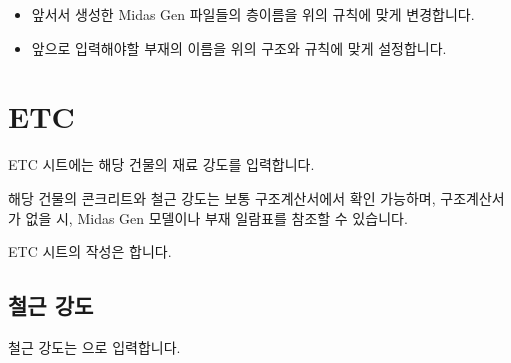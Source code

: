 \documentclass[a4paper,11pt,korean,openany,oneside]{sphinxmanual}
\begin{document}
\begin{figure}[htbp]
\centering
\capstart

\noindent{}
\caption{}\label{\detokenize{2_naming_rules:id5}}\end{figure}

\begin{sphinxShadowBox}
\begin{itemize}
\item {} 
\sphinxAtStartPar
앞서서 생성한 Midas Gen 파일들의 층이름을 위의 규칙에 맞게 변경합니다.

\item {} 
\sphinxAtStartPar
앞으로 입력해야할 부재의 이름을 위의 구조와 규칙에 맞게 설정합니다.

\end{itemize}
\end{sphinxShadowBox}

\sphinxstepscope


\section{ETC}
\label{\detokenize{2_etc:etc}}\label{\detokenize{2_etc::doc}}
\sphinxAtStartPar
ETC 시트에는 해당 건물의 재료 강도를 입력합니다.

\sphinxAtStartPar
해당 건물의 콘크리트와 철근 강도는 보통 구조계산서에서 확인 가능하며,
구조계산서가 없을 시, Midas Gen 모델이나 부재 일람표를 참조할 수 있습니다.

\sphinxAtStartPar
ETC 시트의 작성은 합니다.


\subsection{철근 강도}
\label{\detokenize{2_etc:id1}}
\sphinxAtStartPar
철근 강도는 으로 입력합니다.
\end{document}
